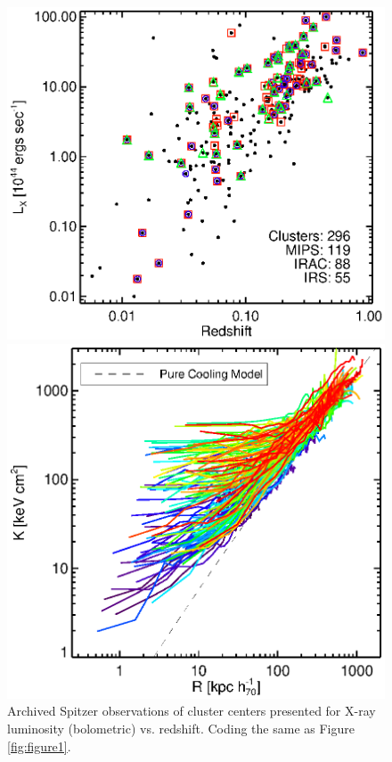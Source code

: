 \documentclass[letterpaper,12pt]{article}
\begin{document}
\begin{figure}[t]
    \begin{minipage}[t]{0.5\linewidth}
        \centering
        \includegraphics*[width=\textwidth, trim=28mm 10mm 30mm 17mm, clip]{spitzer_lx}
        \caption{\small Archived Spitzer observations of cluster centers presented for
        X-ray luminosity (bolometric) vs. redshift. Coding the same as Figure \ref{fig:figure1}.}
        \label{fig:figure6}
    \end{minipage}
    \hspace{0.25cm}
    \begin{minipage}[t]{0.5\linewidth}
        \centering
        \includegraphics*[width=\textwidth, trim=22mm 8mm 30mm 15mm, clip]{splots}

\end{minipage}
\end{figure}
\end{document}
